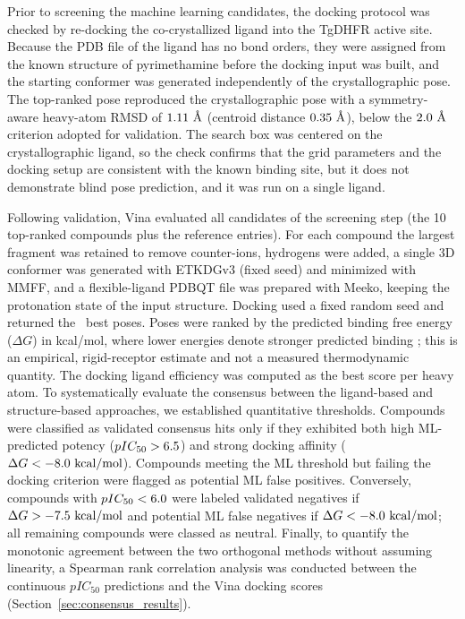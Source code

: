 Prior to screening the machine learning candidates, the docking protocol was checked by re-docking the co-crystallized \RedockLigand{} ligand into the TgDHFR active site. Because the PDB file of the ligand has no bond orders, they were assigned from the known structure of pyrimethamine before the docking input was built, and the starting conformer was generated independently of the crystallographic pose. The top-ranked pose reproduced the crystallographic pose with a symmetry-aware heavy-atom RMSD of $1.11\text{ \AA}$ (centroid distance $0.35\text{ \AA}$), below the $2.0\text{ \AA}$ criterion adopted for validation. The search box was centered on the crystallographic ligand, so the check confirms that the grid parameters and the docking setup are consistent with the known binding site, but it does not demonstrate blind pose prediction, and it was run on a single ligand.

Following validation, Vina evaluated all \DockNTotal{} candidates of the screening step (the 10 top-ranked compounds plus the reference entries). For each compound the largest fragment was retained to remove counter-ions, hydrogens were added, a single 3D conformer was generated with ETKDGv3 (fixed seed) and minimized with MMFF, and a flexible-ligand PDBQT file was prepared with Meeko, keeping the protonation state of the input structure. Docking used a fixed random seed and returned the \DockNPoses\ best poses. Poses were ranked by the predicted binding free energy ($\Delta G$) in kcal/mol, where lower energies denote stronger predicted binding \cite{feng2023}; this is an empirical, rigid-receptor estimate and not a measured thermodynamic quantity. The docking ligand efficiency was computed as the best score per heavy atom. To systematically evaluate the consensus between the ligand-based and structure-based approaches, we established quantitative thresholds. Compounds were classified as validated consensus hits only if they exhibited both high ML-predicted potency ($pIC_{50} > 6.5$) and strong docking affinity ($\Delta G < -8.0\text{ kcal/mol}$). Compounds meeting the ML threshold but failing the docking criterion were flagged as potential ML false positives. Conversely, compounds with $pIC_{50} < 6.0$ were labeled validated negatives if $\Delta G > -7.5\text{ kcal/mol}$ and potential ML false negatives if $\Delta G < -8.0\text{ kcal/mol}$; all remaining compounds were classed as neutral. Finally, to quantify the monotonic agreement between the two orthogonal methods without assuming linearity, a Spearman rank correlation analysis was conducted between the continuous $pIC_{50}$ predictions and the Vina docking scores (Section~\ref{sec:consensus_results}).

